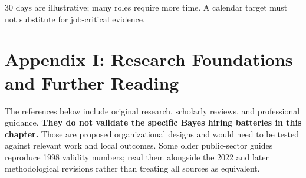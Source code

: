 30 days are illustrative; many roles require more time. A calendar target must not substitute for job-critical evidence.

\section*{Appendix I: Research Foundations and Further Reading}

The references below include original research, scholarly reviews, and professional guidance. \textbf{They do not validate the specific Bayes hiring batteries in this chapter.} Those are proposed organizational designs and would need to be tested against relevant work and local outcomes. Some older public-sector guides reproduce 1998 validity numbers; read them alongside the 2022 and later methodological revisions rather than treating all sources as equivalent.

